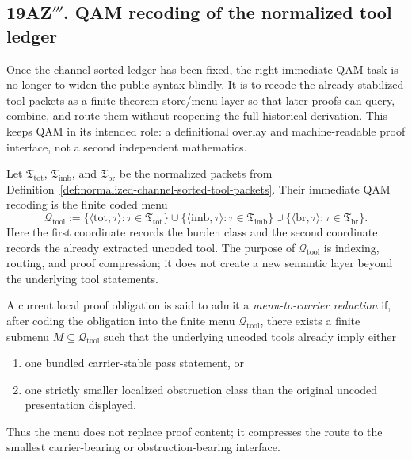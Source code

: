 \subsection*{19AZ$'''$. QAM recoding of the normalized tool ledger}
\label{sec:qam-recoding-normalized-tool-ledger}
Once the channel-sorted ledger has been fixed, the right immediate QAM task is no longer to widen the public syntax blindly. It is to recode the already stabilized tool packets as a finite theorem-store/menu layer so that later proofs can query, combine, and route them without reopening the full historical derivation. This keeps QAM in its intended role: a definitional overlay and machine-readable proof interface, not a second independent mathematics.

\begin{definition}
\label{def:qam-coded-tool-menu}
Let \(\mathfrak T_{\mathrm{tot}}\), \(\mathfrak T_{\mathrm{imb}}\), and \(\mathfrak T_{\mathrm{br}}\) be the normalized packets from Definition~\ref{def:normalized-channel-sorted-tool-packets}. Their immediate QAM recoding is the finite coded menu
\[
\mathcal Q_{\mathrm{tool}}
:=
\bigl\{\langle \mathrm{tot},\tau\rangle : \tau\in\mathfrak T_{\mathrm{tot}}\bigr\}
\cup
\bigl\{\langle \mathrm{imb},\tau\rangle : \tau\in\mathfrak T_{\mathrm{imb}}\bigr\}
\cup
\bigl\{\langle \mathrm{br},\tau\rangle : \tau\in\mathfrak T_{\mathrm{br}}\bigr\}.
\]
Here the first coordinate records the burden class and the second coordinate records the already extracted uncoded tool. The purpose of \(\mathcal Q_{\mathrm{tool}}\) is indexing, routing, and proof compression; it does not create a new semantic layer beyond the underlying tool statements.
\end{definition}

\begin{definition}
\label{def:menu-to-carrier-reduction}
A current local proof obligation is said to admit a \emph{menu-to-carrier reduction} if, after coding the obligation into the finite menu \(\mathcal Q_{\mathrm{tool}}\), there exists a finite submenu \(M\subseteq \mathcal Q_{\mathrm{tool}}\) such that the underlying uncoded tools already imply either
\begin{enumerate}[leftmargin=2em]
  \item one bundled carrier-stable pass statement, or
  \item one strictly smaller localized obstruction class than the original uncoded presentation displayed.
\end{enumerate}
Thus the menu does not replace proof content; it compresses the route to the smallest carrier-bearing or obstruction-bearing interface.
\end{definition}

